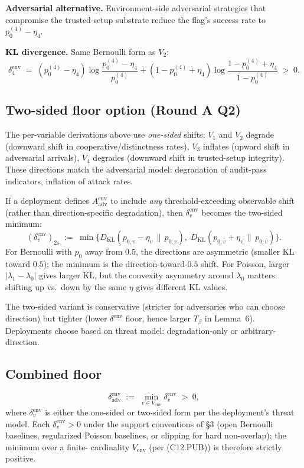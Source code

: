 \documentclass{article}
\newcommand{\Aadv}{A_{\mathrm{adv}}}
\newcommand{\deltaadv}{\delta_{\mathrm{adv}}}
\newcommand{\Tbeta}{T_{\beta}}
\newcommand{\Vem}{V_{\mathrm{env}}}
\begin{document}
\textbf{Adversarial alternative.}  Environment-side adversarial
strategies that compromise the trusted-setup substrate reduce the
flag's success rate to $p_0^{(4)} - \eta_4$.

\textbf{KL divergence.}  Same Bernoulli form as $V_2$:
\[
  \delta_4^{\mathrm{env}} \;=\; (p_0^{(4)} - \eta_4)
  \log\!\frac{p_0^{(4)} - \eta_4}{p_0^{(4)}} +
  (1 - p_0^{(4)} + \eta_4) \log\!\frac{1 - p_0^{(4)} + \eta_4}
  {1 - p_0^{(4)}} \;>\; 0.
\]

\subsection{Two-sided floor option (Round A Q2)}

The per-variable derivations above use \emph{one-sided} shifts:
$V_1$ and $V_2$ degrade (downward shift in cooperative/distinctness
rates), $V_3$ inflates (upward shift in adversarial arrivals), $V_4$
degrades (downward shift in trusted-setup integrity).  These
directions match the adversarial model: degradation of audit-pass
indicators, inflation of attack rates.

If a deployment defines $\Aadv^{\mathrm{env}}$ to include
\emph{any} threshold-exceeding observable shift (rather than
direction-specific degradation), then $\delta_v^{\mathrm{env}}$
becomes the two-sided minimum:
\[
  (\delta_v^{\mathrm{env}})_{\mathrm{2s}} \;:=\; \min\bigl\{
  D_{\mathrm{KL}}(p_{0,v} - \eta_v \,\|\, p_{0,v}),\;
  D_{\mathrm{KL}}(p_{0,v} + \eta_v \,\|\, p_{0,v})
  \bigr\}.
\]
For Bernoulli with $p_0$ away from $0.5$, the directions are
asymmetric (smaller KL toward $0.5$); the minimum is the
direction-toward-$0.5$ shift.  For Poisson, larger
$|\lambda_1 - \lambda_0|$ gives larger KL, but the convexity
asymmetry around $\lambda_0$ matters: shifting up vs.\ down by the
same $\eta$ gives different KL values.

The two-sided variant is conservative (stricter for adversaries who
can choose direction) but tighter (lower $\delta^{\mathrm{env}}$
floor, hence larger $\Tbeta$ in Lemma~6).  Deployments choose based
on threat model: degradation-only or arbitrary-direction.

\subsection{Combined floor}

\[
  \deltaadv^{\mathrm{env}} \;:=\; \min_{v \in \Vem}
  \delta_v^{\mathrm{env}} \;>\; 0,
\]
where $\delta_v^{\mathrm{env}}$ is either the one-sided or
two-sided form per the deployment's threat model.  Each
$\delta_v^{\mathrm{env}} > 0$ under the support conventions of §3
(open Bernoulli baselines, regularized Poisson baselines, or
clipping for hard non-overlap); the minimum over a finite-
cardinality $\Vem$ (per (C12.PUB)) is therefore strictly positive.
\end{document}
